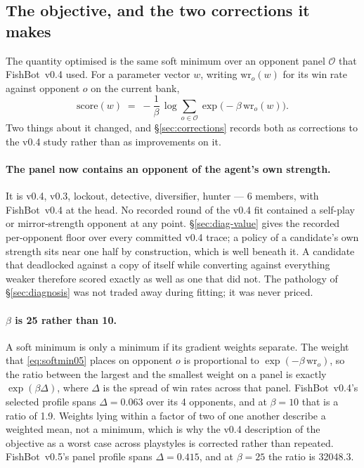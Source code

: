\documentclass[11pt]{article}
\theoremstyle{definition}
\DeclareRobustCommand{\vfive}{\texorpdfstring{\mbox{FishBot v0.5}}{FishBot v0.5}}
\DeclareRobustCommand{\vfour}{\texorpdfstring{\mbox{FishBot v0.4}}{FishBot v0.4}}
\providecommand{\numSoftMinBeta}{10}
\providecommand{\numSoftMinRatio}{1.9}
\providecommand{\numFitPanel}{v0.4, v0.3, lockout, detective, diversifier, hunter}
\providecommand{\numFitPanelN}{6}
\providecommand{\numFitBeta}{25}
\providecommand{\numFitSpan}{0.415}
\providecommand{\numFitRatio}{32048.3}
\providecommand{\numSoftMinSpan}{0.063}
\providecommand{\numSoftMinPanelN}{4}
\begin{document}
\subsection{The objective, and the two corrections it makes}
\label{sec:fit-objective}

The quantity optimised is the same soft minimum over an opponent panel
$\mathcal{O}$ that \vfour{} used. For a parameter vector $w$, writing
$\mathrm{wr}_o(w)$ for its win rate against opponent $o$ on the current bank,
\begin{equation}
  \mathrm{score}(w) \;=\; -\frac{1}{\beta}\,
    \log \sum_{o \in \mathcal{O}} \exp\bigl(-\beta\,\mathrm{wr}_o(w)\bigr).
  \label{eq:softmin05}
\end{equation}
Two things about it changed, and \S\ref{sec:corrections} records both as
corrections to the v0.4 study rather than as improvements on it.

\paragraph{The panel now contains an opponent of the agent's own strength.} It is
\numFitPanel{} --- \numFitPanelN{} members, with \vfour{} at the head. No
recorded round of the v0.4 fit contained a self-play or mirror-strength opponent
at any point. \S\ref{sec:diag-value} gives the recorded per-opponent floor over
every committed v0.4 trace; a policy of a candidate's own strength sits near one
half by construction, which is well beneath it. A candidate that
deadlocked against a copy of itself while converting against everything weaker
therefore scored exactly as well as one that did not. The pathology of
\S\ref{sec:diagnosis} was not traded away during fitting; it was never priced.

\paragraph{$\beta$ is \numFitBeta{} rather than \numSoftMinBeta{}.} A soft
minimum is only a minimum if its gradient weights separate. The weight that
\eqref{eq:softmin05} places on opponent $o$ is proportional to
$\exp(-\beta\,\mathrm{wr}_o)$, so the ratio between the largest and the smallest
weight on a panel is exactly $\exp(\beta\Delta)$, where $\Delta$ is the spread of
win rates across that panel. \vfour{}'s selected profile spans
$\Delta = \numSoftMinSpan$ over its \numSoftMinPanelN{} opponents, and at
$\beta = \numSoftMinBeta$ that is a ratio of \numSoftMinRatio{}. Weights lying
within a factor of two of one another describe a weighted mean, not a minimum,
which is why the v0.4 description of the objective as a worst case across
playstyles is corrected rather than repeated. \vfive{}'s panel profile spans
$\Delta = \numFitSpan$, and at $\beta = \numFitBeta$ the ratio is
\numFitRatio{}.
\end{document}
